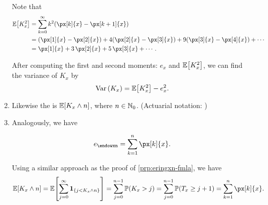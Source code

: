 \begin{enumerate}
\begin{pf}
Note that
\begin{align*}
\expv{K_x^2}
&=\sum_{k=0}^{\infty}k^2(\px[k]{x}-\px[k+1]{x})\\
&=(\px[1]{x}-\px[2]{x})+4(\px[2]{x}-\px[3]{x})+9(\px[3]{x}-\px[4]{x})+\dotsb\\
&=\px[1]{x}+3\,\px[2]{x}+5\,\px[3]{x}+\dotsb.
\end{align*}
\end{pf}

After computing the first and second moments: \(e_x\) and \(\mathbb{E}\qty[K_x^2]\), we
can find the variance of \(K_x\) by
\[
\operatorname{Var}\qty(K_x)=\mathbb{E}\qty[K_x^2]-e_x^2.
\]
\item Likewise the  is \(\mathbb{E}\qty[K_x\wedge
n]\), where \(n\in\mathbb{N}_0\). (Actuarial notation: )
\item Analogously, we have
\begin{proposition}
\[
e_{\endowxn}=\sum_{k=1}^{n}\px[k]{x}.
\]
\end{proposition}
\begin{pf}
Using a similar approach as the proof of \cref{prp:eringxn-fmla}, we have
\[
\expv{K_x\wedge n}
=\expv{\sum_{j=0}^{\infty}\indicset{j<K_x \wedge n}}
=\sum_{j=0}^{n-1}\prob{K_x>j}
=\sum_{j=0}^{n-1}\prob{T_x\ge j+1}
=\sum_{k=1}^{n}\px[k]{x}.
\]
\end{pf}
\end{enumerate}
